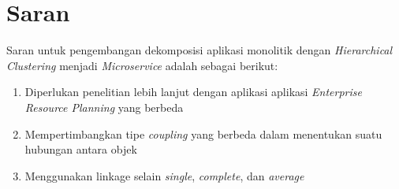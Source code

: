 \section{Saran}
Saran  untuk pengembangan dekomposisi aplikasi monolitik dengan \textit{Hierarchical Clustering} menjadi \textit{Microservice} adalah sebagai berikut:
\begin{enumerate}[nolistsep,leftmargin=0.5cm]
    \item  Diperlukan penelitian lebih lanjut dengan aplikasi aplikasi \textit{Enterprise Resource Planning} yang berbeda 
    \item  Mempertimbangkan tipe  \textit{coupling} yang berbeda dalam menentukan suatu hubungan antara objek
    \item  Menggunakan linkage selain \textit{single}, \textit{complete}, dan \textit{average}
\end{enumerate}